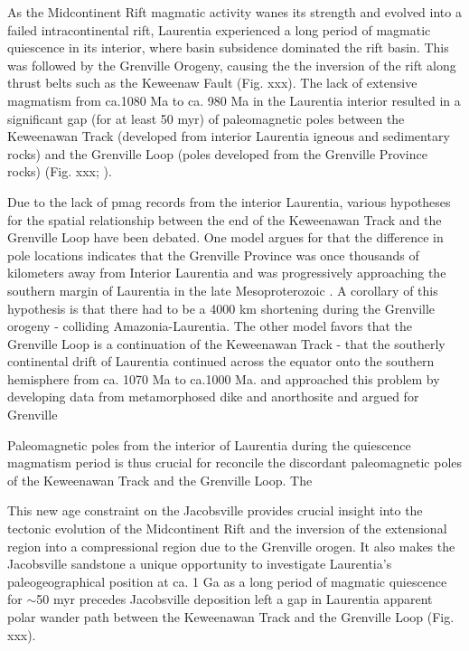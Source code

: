 \documentclass[draft]{agujournal2019}
\begin{document}
As the Midcontinent Rift magmatic activity wanes its strength and evolved into a failed intracontinental rift, Laurentia experienced a long period of magmatic quiescence in its interior, where basin subsidence dominated the rift basin. This was followed by the Grenville Orogeny, causing the the inversion of the rift along thrust belts such as the Keweenaw Fault (Fig. xxx). The lack of extensive magmatism from ca.1080 Ma to ca. 980 Ma in the Laurentia interior resulted in a significant gap (for at least 50 myr) of paleomagnetic poles between the Keweenawan Track (developed from interior Laurentia igneous and sedimentary rocks) and the Grenville Loop (poles developed from the Grenville Province rocks) (Fig. xxx; \cite{Swanson-Hysell2019a}).  

Due to the lack of pmag records from the interior Laurentia, various hypotheses for the spatial relationship between the end of the Keweenawan Track and the Grenville Loop have been debated. One model argues for that the difference in pole locations indicates that the Grenville Province was once thousands of kilometers away from Interior Laurentia and was progressively approaching the southern margin of Laurentia in the late Mesoproterozoic \citep{Halls2015}. A corollary of this hypothesis is that there had to be a 4000 km shortening during the Grenville orogeny - colliding Amazonia-Laurentia. The other model favors that the Grenville Loop is a continuation of the Keweenawan Track - that the southerly continental drift of Laurentia continued across the equator onto the southern hemisphere from ca. 1070 Ma to ca.1000 Ma. and  approached this problem by developing data from metamorphosed dike and anorthosite and argued for Grenville  

Paleomagnetic poles from the interior of Laurentia during the quiescence magmatism period is thus crucial for reconcile the discordant paleomagnetic poles of the Keweenawan Track and the Grenville Loop. The

This new age constraint on the Jacobsville provides crucial insight into the tectonic evolution of the Midcontinent Rift and the inversion of the extensional region into a compressional region due to the Grenville orogen. It also makes the Jacobsville sandstone a unique opportunity to investigate Laurentia's paleogeographical position at ca. 1 Ga as a long period of magmatic quiescence for $\sim$50 myr precedes Jacobsville deposition left a gap in Laurentia apparent polar wander path between the Keweenawan Track and the Grenville Loop (Fig. xxx). 
\end{document}
